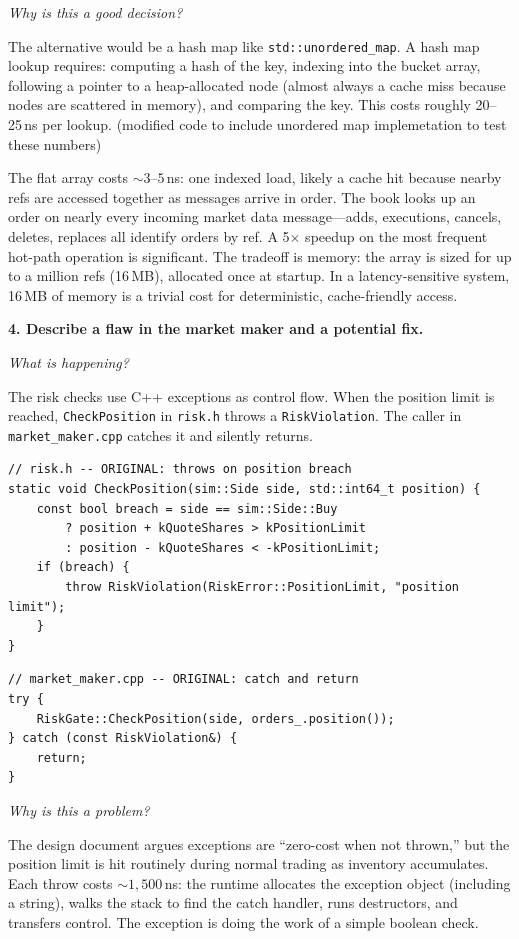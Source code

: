 \documentclass[11pt]{article}
\newcommand{\prompt}[1]{\par\medskip\noindent\textbf{#1}\par\smallskip\noindent\ignorespaces}
\newcommand{\sq}[1]{\par\smallskip\noindent\textit{#1}\par\noindent\ignorespaces}
\begin{document}
\sq{Why is this a good decision?}
The alternative would be a hash map like \texttt{std::unordered\_map}. A hash map lookup requires: computing a hash of the key, indexing into the bucket array, following a pointer to a heap-allocated node (almost always a cache miss because nodes are scattered in memory), and comparing the key. This costs roughly 20--25\,ns per lookup. (modified code to include unordered map implemetation to test these numbers)

The flat array costs ${\sim}3$--$5$\,ns: one indexed load, likely a cache hit because nearby refs are accessed together as messages arrive in order. The book looks up an order on nearly every incoming market data message---adds, executions, cancels, deletes, replaces all identify orders by ref. A 5$\times$ speedup on the most frequent hot-path operation is significant. The tradeoff is memory: the array is sized for up to a million refs (16\,MB), allocated once at startup. In a latency-sensitive system, 16\,MB of memory is a trivial cost for deterministic, cache-friendly access.

\prompt{4. Describe a flaw in the market maker and a potential fix.}

\sq{What is happening?}
The risk checks use C++ exceptions as control flow. When the position limit is reached, \texttt{CheckPosition} in \texttt{risk.h} throws a \texttt{RiskViolation}. The caller in \texttt{market\_maker.cpp} catches it and silently returns.

\begin{lstlisting}
// risk.h -- ORIGINAL: throws on position breach
static void CheckPosition(sim::Side side, std::int64_t position) {
    const bool breach = side == sim::Side::Buy
        ? position + kQuoteShares > kPositionLimit
        : position - kQuoteShares < -kPositionLimit;
    if (breach) {
        throw RiskViolation(RiskError::PositionLimit, "position limit");
    }
}
\end{lstlisting}

\begin{lstlisting}
// market_maker.cpp -- ORIGINAL: catch and return
try {
    RiskGate::CheckPosition(side, orders_.position());
} catch (const RiskViolation&) {
    return;
}
\end{lstlisting}

\sq{Why is this a problem?}
The design document argues exceptions are ``zero-cost when not thrown,'' but the position limit is hit routinely during normal trading as inventory accumulates. Each throw costs ${\sim}1{,}500$\,ns: the runtime allocates the exception object (including a string), walks the stack to find the catch handler, runs destructors, and transfers control. The exception is doing the work of a simple boolean check.
\end{document}
